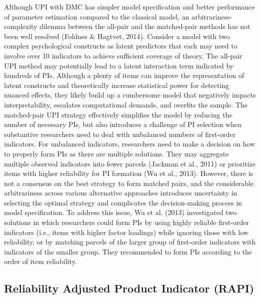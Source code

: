 \documentclass[
  man]{apa6}
\begin{document}
Although UPI with DMC has simpler model specification and better performance of parameter estimation compared to the classical model, an arbitrariness-complexity dilemma between the all-pair and the matched-pair methods has not been well resolved (Foldnes \& Hagtvet, 2014). Consider a model with two complex psychological constructs as latent predictors that each may need to involve over 10 indicators to achieve sufficient coverage of theory. The all-pair UPI method may potentially lead to a latent interaction term indicated by hundreds of PIs. Although a plenty of items can improve the representation of latent constructs and theoretically increase statistical power for detecting nuanced effects, they likely build up a cumbersome model that negatively impacts interpretability, escalates computational demands, and overfits the sample. The matched-pair UPI strategy effectively simplifies the model by reducing the number of necessary PIs, but also introduces a challenge of PI selection when substantive researchers need to deal with unbalanced numbers of first-order indicators. For unbalanced indicators, researchers need to make a decision on how to properly form PIs as there are multiple solutions. They may aggregate multiple observed indicators into fewer parcels (Jackman et al., 2011) or prioritize items with higher reliability for PI formation (Wu et al., 2013). However, there is not a consensus on the best strategy to form matched pairs, and the considerable arbitrariness across various alternative approaches introduces uncertainty in selecting the optimal strategy and complicates the decision-making process in model specification. To address this issue, Wu et al. (2013) investigated two solutions in which researchers could form PIs by using highly reliable first-order indicators (i.e., items with higher factor loadings) while ignoring those with low reliability, or by matching parcels of the larger group of first-order indicators with indicators of the smaller group. They recommended to form PIs according to the order of item reliability.

\subsection{Reliability Adjusted Product Indicator (RAPI)}\label{reliability-adjusted-product-indicator-rapi}
\end{document}
